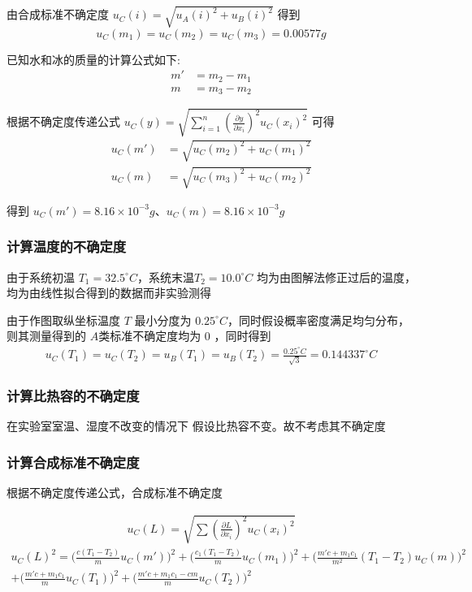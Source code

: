 \documentclass[UTF8]{ctexart}
\begin{document}
由合成标准不确定度 $u_C(i) = \sqrt{u_A(i)^2 + u_B(i)^2}$ 得到  $$u_C(m_1) = u_C(m_2) = u_C(m_3) = 0.00577g$$

已知水和冰的质量的计算公式如下:
\begin{align*}
    m' &= m_2 - m_1 \\
    m  &= m_3 - m_2 
\end{align*}

根据不确定度传递公式 $u_C(y)=\sqrt{\sum_{i=1}^{n}(\frac{\partial y}{\partial x_i})^2u_C(x_i)^2}$ 可得 
\begin{align*}
    u_C(m') &= \sqrt{u_C(m_2)^2 +u_C(m_1)^2} \\
    u_C(m)  &= \sqrt{u_C(m_3)^2 +u_C(m_2)^2}
\end{align*}

得到 $u_C(m') = 8.16 \times 10^{-3}g$、$u_C(m)= 8.16 \times 10^{-3}g$

\subsubsection{计算温度的不确定度}
由于系统初温  $T_1 = 32.5^{\circ} C$，系统末温$T_2 = 10.0^{\circ} C$ 均为由图解法修正过后的温度，均为由线性拟合得到的数据而非实验测得

由于作图取纵坐标温度 $T$ 最小分度为 $0.25^{\circ} C$，同时假设概率密度满足均匀分布，则其测量得到的 $A$类标准不确定度均为 0 ，同时得到
\begin{align*}
    u_C(T_1) =  u_C(T_2) = u_B(T_1) = u_B(T_2) = \frac{0.25^{\circ} C}{\sqrt{3}} = 0.144337^{\circ} C
\end{align*}
\subsubsection{计算比热容的不确定度}
在实验室室温、湿度不改变的情况下 假设比热容不变。故不考虑其不确定度

\subsubsection{计算合成标准不确定度}
根据不确定度传递公式，合成标准不确定度

\begin{align*}
    u_C(L) = \sqrt{\sum (\frac{\partial L}{\partial x_i})^2u_C(x_i)^2 } 
\end{align*}
\begin{align*}
    u_C(L)^2 = 
     \Big( \frac{c(T_1 - T_2)}{m}u_C(m') \Big)^2 + \Big( \frac{c_1(T_1 - T_2)}{m}u_C(m_1) \Big)^2 +  \Big( \frac{m'c+m_1c_1}{m^2}(T_1-T_2)u_C(m) \Big)^2\\ + \Big( \frac{m'c+m_1c_1}{m}u_C(T_1) \Big) ^2 + \Big(  \frac{m'c+m_1c_1 -cm}{m}u_C(T_2) \Big) ^2
\end{align*}
\end{document}

